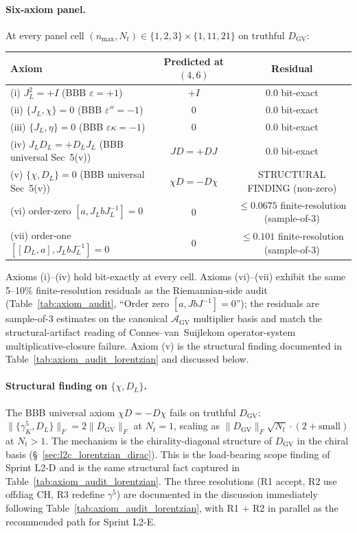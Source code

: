 \documentclass[11pt]{article}
\begin{document}
\paragraph{Six-axiom panel.}
At every panel cell $(n_{\max}, N_t) \in \{1, 2, 3\} \times \{1, 11,
21\}$ on truthful $D_{\mathrm{GV}}$:

\begin{center}
\begin{tabular}{lcc}
\toprule
Axiom & Predicted at $(4, 6)$ & Residual \\
\midrule
(i) $J_L^2 = +I$ (BBB $\varepsilon = +1$) & $+I$ & $0.0$ bit-exact \\
(ii) $\{J_L, \chi\} = 0$ (BBB $\varepsilon'' = -1$) & $0$ & $0.0$ bit-exact \\
(iii) $\{J_L, \eta\} = 0$ (BBB $\varepsilon\kappa = -1$) & $0$ & $0.0$ bit-exact \\
(iv) $J_L D_L = +D_L J_L$ (BBB universal Sec~5(v)) & $JD = +DJ$ & $0.0$ bit-exact \\
(v) $\{\chi, D_L\} = 0$ (BBB universal Sec~5(v)) & $\chi D = -D\chi$
  & STRUCTURAL FINDING (non-zero) \\
(vi) order-zero $[a, J_L b J_L^{-1}] = 0$ & $0$
  & $\le 0.0675$ finite-resolution (sample-of-3) \\
(vii) order-one $[[D_L, a], J_L b J_L^{-1}] = 0$ & $0$
  & $\le 0.101$ finite-resolution (sample-of-3) \\
\bottomrule
\end{tabular}
\end{center}

Axioms (i)--(iv) hold bit-exactly at every cell.  Axioms (vi)--(vii)
exhibit the same 5--10\% finite-resolution residuals as the
Riemannian-side audit (Table~\ref{tab:axiom_audit}, ``Order zero
$[a, J b J^{-1}] = 0$''); the residuals are sample-of-3 estimates on
the canonical $\mathcal{A}_{\mathrm{GV}}$ multiplier basis and
match the structural-artifact reading of Connes--van~Suijlekom
operator-system multiplicative-closure failure.  Axiom (v) is the
structural finding documented in
Table~\ref{tab:axiom_audit_lorentzian} and discussed below.

\paragraph{Structural finding on $\{\chi, D_L\}$.}
The BBB universal axiom $\chi D = -D\chi$ fails on truthful
$D_{\mathrm{GV}}$:\ $\|\{\gamma^5_K, D_L\}\|_F = 2\|D_{\mathrm{GV}}\|_F$
at $N_t = 1$, scaling as
$\|D_{\mathrm{GV}}\|_F \sqrt{N_t} \cdot (2 + \mathrm{small})$ at
$N_t > 1$.  The mechanism is the chirality-diagonal structure of
$D_{\mathrm{GV}}$ in the chiral basis (\S~\ref{sec:l2c_lorentzian_dirac}).
This is the load-bearing scope finding of Sprint L2-D and is the same
structural fact captured in Table~\ref{tab:axiom_audit_lorentzian}.
The three resolutions (R1 accept, R2 use offdiag CH, R3 redefine
$\gamma^5$) are documented in the discussion immediately following
Table~\ref{tab:axiom_audit_lorentzian}, with R1 + R2 in parallel as
the recommended path for Sprint L2-E.
\end{document}
